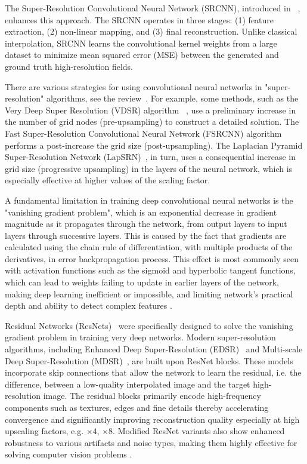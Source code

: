 \documentclass{ieeeaccess}
\begin{document}
The Super-Resolution Convolutional Neural Network (SRCNN), introduced in ~\cite{Dong_SR}, enhances this approach. The SRCNN operates in three stages: (1) feature extraction, (2) non-linear mapping, and (3) final reconstruction. Unlike classical interpolation, SRCNN learns the convolutional kernel weights from a large dataset to minimize mean squared error (MSE) between the generated and ground truth high-resolution fields.

There are various strategies for using convolutional neural networks in "super-resolution" algorithms, see the review~\cite{Wang_SR_srv}. For example, some methods, such as the Very Deep Super Resolution (VDSR) algorithm ~\cite{Kim_VDSR}, use a preliminary increase in the number of  grid nodes (pre-upsampling) to construct a detailed solution. The Fast Super-Resolution Convolutional Neural Network (FSRCNN)  algorithm~\cite{Dong_FSRCNN} performs a post-increase the grid size (post-upsampling). The Laplacian Pyramid Super-Resolution Network (LapSRN)~\cite{Lai_LapSRCNN}, in turn,  uses a consequential increase in grid size (progressive upsampling) in the layers of the neural network, which is especially effective at higher values of the scaling factor.


A fundamental limitation in training deep convolutional neural networks is the "vanishing gradient problem", which is an exponential decrease in gradient magnitude as it propagates through the network, from output layers to input layers through successive layers. This is caused by the fact that gradients are calculated using the chain rule of differentiation, with multiple products of the derivatives, in error backpropagation process. This effect is most commonly seen with activation functions such as the sigmoid and hyperbolic tangent functions, which can lead to weights failing to update in earlier layers of the network, making deep learning inefficient or impossible, and limiting network's practical depth and ability to detect complex features
\cite{He_ResNet}.

Residual Networks (ResNets)~\cite{Zhang_ResSR} were specifically designed to solve the vanishing gradient problem in training very deep networks. Modern super-resolution algorithms, including Enhanced Deep Super-Resolution (EDSR)~\cite{Lim_EDSR} and Multi-scale Deep Super-Resolution (MDSR)~\cite{Gao_MDSR}, are built upon ResNet blocks. These models incorporate skip connections that allow the network to learn the residual, i.e. the difference, between a low-quality interpolated image and the target high-resolution image. The residual blocks primarily encode high-frequency components such as textures, edges and fine details thereby accelerating convergence and significantly improving reconstruction quality especially at high upscaling factors, e.g. $\times4$, $\times8$. Modified ResNet variants also show enhanced robustness to various artifacts and noise types, making them highly effective for solving computer vision problems \cite{He_ResNet}.
\end{document}
